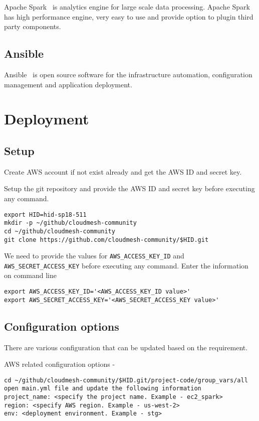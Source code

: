 Apache Spark~\cite{hid-sp18-511-www-spark} is analytics engine for
large scale data processing. Apache
Spark~\cite{hid-sp18-511-www-spark} has high performance engine, very
easy to use and provide option to plugin third party components.

\subsection{Ansible}

Ansible~\cite{hid-sp18-511-www-ansible} is open source software for
the infrastructure automation, configuration management and
application deployment.

\section{Deployment}

\subsection{Setup}

Create AWS account if not exist already and get the AWS ID and secret key.

Setup the git repository and provide the AWS ID and secret key before
executing any command.

\begin{verbatim}
export HID=hid-sp18-511
mkdir -p ~/github/cloudmesh-community
cd ~/github/cloudmesh-community
git clone https://github.com/cloudmesh-community/$HID.git
\end{verbatim}

We need to provide the values for \verb|AWS_ACCESS_KEY_ID|
and \verb|AWS_SECRET_ACCESS_KEY| before executing any command. Enter
the information on command line

\begin{verbatim}
export AWS_ACCESS_KEY_ID='<AWS_ACCESS_KEY_ID value>'
export AWS_SECRET_ACCESS_KEY='<AWS_SECRET_ACCESS_KEY value>'
\end{verbatim}

\subsection{Configuration options}

There are various configuration that can be updated based on the requirement.

AWS related configuration options -

\begin{verbatim}
cd ~/github/cloudmesh-community/$HID.git/project-code/group_vars/all
open main.yml file and update the following information
project_name: <specify the project name. Example - ec2_spark>
region: <specify AWS region. Example - us-west-2>
env: <deployment environment. Example - stg>
\end{verbatim}

